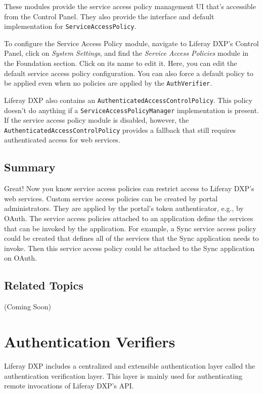 These modules provide the service access policy management UI that's
accessible from the Control Panel. They also provide the interface and
default implementation for \texttt{ServiceAccessPolicy}.

To configure the Service Access Policy module, navigate to Liferay DXP's
Control Panel, click on \emph{System Settings}, and find the
\emph{Service Access Policies} module in the Foundation section. Click
on its name to edit it. Here, you can edit the default service access
policy configuration. You can also force a default policy to be applied
even when no policies are applied by the \texttt{AuthVerifier}.

Liferay DXP also contains an \texttt{AuthenticatedAccessControlPolicy}.
This policy doesn't do anything if a \texttt{ServiceAccessPolicyManager}
implementation is present. If the service access policy module is
disabled, however, the \texttt{AuthenticatedAccessControlPolicy}
provides a fallback that still requires authenticated access for web
services.

\subsection{Summary}\label{summary-1}

Great! Now you know service access policies can restrict access to
Liferay DXP's web services. Custom service access policies can be
created by portal administrators. They are applied by the portal's token
authenticator, e.g., by OAuth. The service access policies attached to
an application define the services that can be invoked by the
application. For example, a Sync service access policy could be created
that defines all of the services that the Sync application needs to
invoke. Then this service access policy could be attached to the Sync
application on OAuth.

\subsection{Related Topics}\label{related-topics-4}

(Coming Soon)

\section{Authentication Verifiers}\label{authentication-verifiers}

Liferay DXP includes a centralized and extensible authentication layer
called the authentication verification layer. This layer is mainly used
for authenticating remote invocations of Liferay DXP's API.

